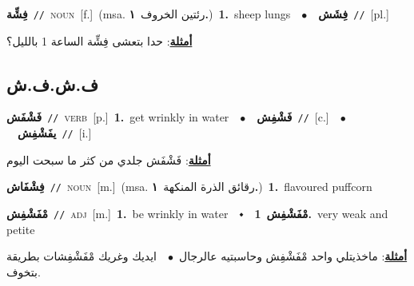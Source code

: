 \documentclass[10pt,a4paper,twoside]{article} %
\begin{document}
\begin{multicols}{2}
{\setlength\topsep{0pt}\textbf{\foreignlanguage{arabic}{فِشِّة}}\ {\color{gray}\texttt{//}\color{black}}\ \textsc{noun}\ [f.]\ \color{gray}(msa. \foreignlanguage{arabic}{رئتين الخروف}~\foreignlanguage{arabic}{\textbf{١.}})\color{black}\ \textbf{1.}~sheep lungs\ \ $\bullet$\ \ \setlength\topsep{0pt}\textbf{\foreignlanguage{arabic}{فِشَش}}\ {\color{gray}\texttt{//}\color{black}}\ [pl.]\  \begin{flushright}\color{gray}\foreignlanguage{arabic}{\textbf{\underline{\foreignlanguage{arabic}{أمثلة}}}: حدا بتعشى فِشِّة الساعة 1 بالليل؟}\end{flushright}\color{black}} \vspace{2mm}

\vspace{-3mm}
\subsection*{\color{blue}\foreignlanguage{arabic}{ف.ش.ف.ش}\color{blue}{}} 

{\setlength\topsep{0pt}\textbf{\foreignlanguage{arabic}{فَشْفَش}}\ {\color{gray}\texttt{//}\color{black}}\ \textsc{verb}\ [p.]\ \textbf{1.}~get wrinkly in water\ \ $\bullet$\ \ \setlength\topsep{0pt}\textbf{\foreignlanguage{arabic}{فَشْفِش}}\ {\color{gray}\texttt{//}\color{black}}\ [c.]\ \ $\bullet$\ \ \setlength\topsep{0pt}\textbf{\foreignlanguage{arabic}{يفَشْفِش}}\ {\color{gray}\texttt{//}\color{black}}\ [i.]\  \begin{flushright}\color{gray}\foreignlanguage{arabic}{\textbf{\underline{\foreignlanguage{arabic}{أمثلة}}}: فَشْفَش جلدي من كثر ما سبحت اليوم}\end{flushright}\color{black}} \vspace{2mm}

{\setlength\topsep{0pt}\textbf{\foreignlanguage{arabic}{فِشْفَاش}}\ {\color{gray}\texttt{//}\color{black}}\ \textsc{noun}\ [m.]\ \color{gray}(msa. \foreignlanguage{arabic}{رقائق الذرة المنكهة}~\foreignlanguage{arabic}{\textbf{١.}})\color{black}\ \textbf{1.}~flavoured puffcorn\ } \vspace{2mm}

{\setlength\topsep{0pt}\textbf{\foreignlanguage{arabic}{مْفَشْفِش}}\ {\color{gray}\texttt{//}\color{black}}\ \textsc{adj}\ [m.]\ \textbf{1.}~be wrinkly in water\ \ $\smblkdiamond$\ \ \setlength\topsep{0pt}\textbf{\foreignlanguage{arabic}{مْفَشْفِش}}\ \textbf{1.}~very weak and petite\  \begin{flushright}\color{gray}\foreignlanguage{arabic}{\textbf{\underline{\foreignlanguage{arabic}{أمثلة}}}: ماخذيتلي واحد مْفَشْفِش وحاسبتيه عالرجال\ $\bullet$\ \  ايديك وغريك مْفَشْفِشات بطريقة بتخوف.}\end{flushright}\color{black}} \vspace{2mm}


\end{multicols}
\end{document}
